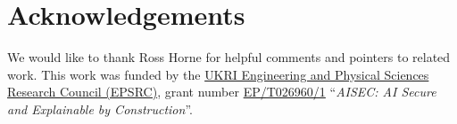 \documentclass{lmcs}
\begin{document}
\maketitle


%






\section*{Acknowledgements}

We would like to thank Ross Horne for helpful comments and pointers to
related work. This work was funded by the
\href{https://www.ukri.org/about-us/epsrc/}{UKRI Engineering and
  Physical Sciences Research Council (EPSRC)}, grant number
\href{https://gow.epsrc.ukri.org/NGBOViewGrant.aspx?GrantRef=EP/T026960/1}{EP/T026960/1}
``\emph{AISEC: AI Secure and Explainable by Construction}''.





% 
\end{document}
